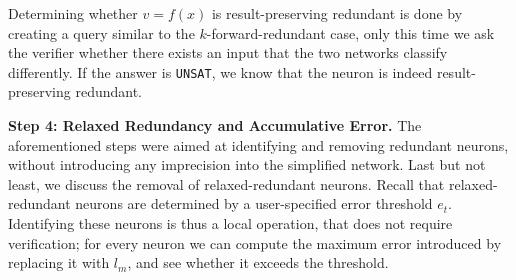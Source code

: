 \documentclass[10pt, conference, twocolumn, compsocconf]{IEEEtran}
\theoremstyle{remark}
\newcommand{\kfr}{$k$-forward-redundant}
\newcommand{\errorMinimizerFunction}{l_m}
\newcommand{\unsat}{\texttt{UNSAT}}
\begin{document}
Determining whether $v=f(x)$ is result-preserving redundant
is done by creating a query similar to the \kfr{} case, only this time
we ask the verifier whether there exists
an input that the two networks classify differently. If the answer is
\unsat{}, we know that the neuron is indeed result-preserving
redundant.

\medskip
\noindent
\textbf{Step 4: Relaxed Redundancy and Accumulative Error.}  The
aforementioned steps were aimed at identifying and removing redundant
neurons, without introducing any imprecision into the simplified
network. Last but not least, we discuss the removal of
relaxed-redundant neurons. Recall that relaxed-redundant neurons are
determined by a user-specified error threshold $e_t$.  Identifying
these neurons is thus a local operation, that does not require
verification; for every neuron we can compute the maximum error
introduced by replacing it with $\errorMinimizerFunction$, and see
whether it exceeds the threshold.

%
%
%

\end{document}
